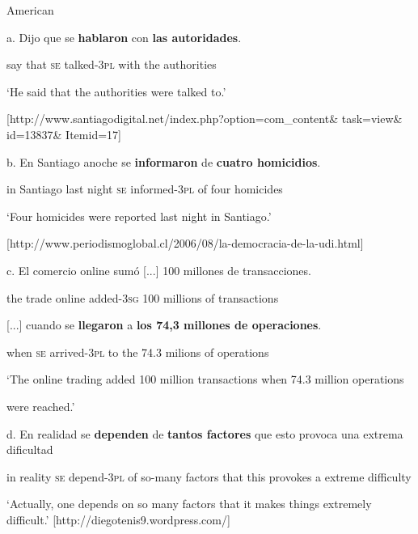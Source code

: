 \documentclass[output=paper]{langsci/langscibook}
\begin{document}
          American 

a.   Dijo que se  \textbf{hablaron}    con   \textbf{las   autoridades}.

                  say  that \textsc{se}   talked-\textsc{3pl}  with  the  authorities

‘He said that the authorities were talked to.’

[http://www.santiagodigital.net/index.php?option=com\_content\& task=view\& id=13837\& Itemid=17]

b.  En Santiago anoche    se  \textbf{informaron}   de \textbf{cuatro  homicidios}.

in  Santiago last night \textsc{se}   informed-\textsc{3pl} of  four     homicides

‘Four homicides were reported last night in Santiago.’

[http://www.periodismoglobal.cl/2006/08/la-democracia-de-la-udi.html]

c.   El  comercio online sumó [...]   100 millones de transacciones.  

the trade       online added{}-\textsc{3sg} 100 millions  of transactions

[...] cuando se   \textbf{llegaron}       a   \textbf{los 74,3 millones  de operaciones}.

           when    \textsc{se}   arrived{}-\textsc{3pl}  to the 74.3 milions    of operations

      ‘The online trading added 100 million transactions when 74.3 million operations 

      were reached.’ 

\begin{styleBodyTextIndentii}
\end{styleBodyTextIndentii}

d.   En realidad se  \textbf{dependen} de  \textbf{tantos factores}  que  esto provoca  una extrema  dificultad

     in   reality   \textsc{se}   depend{}-\textsc{3pl} of   so-many    factors  that this provokes a    extreme  difficulty

\begin{styleBodyTextIndentiii}
‘Actually, one depends on so many factors that it makes things extremely difficult.’ [http://diegotenis9.wordpress.com/]
\end{styleBodyTextIndentiii}
\end{document}
